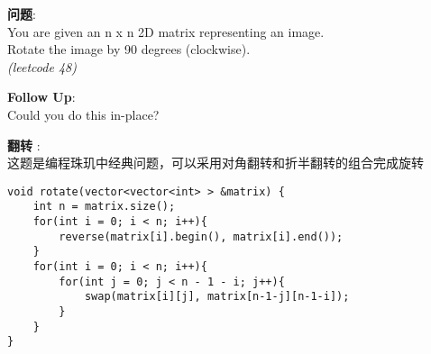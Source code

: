     
\begin{description}
    \item{\textbf{问题}}:\\
You are given an n x n 2D matrix representing an image.\\
Rotate the image by 90 degrees (clockwise). \\
\textit{(leetcode 48)}
    \item{\textbf{Follow Up}}:\\
Could you do this in-place?
    \item{\textbf{翻转}} : 
    \\这题是编程珠玑中经典问题，可以采用对角翻转和折半翻转的组合完成旋转
    \begin{lstlisting}
void rotate(vector<vector<int> > &matrix) {
	int n = matrix.size();
	for(int i = 0; i < n; i++){
		reverse(matrix[i].begin(), matrix[i].end());
	}
	for(int i = 0; i < n; i++){
		for(int j = 0; j < n - 1 - i; j++){
			swap(matrix[i][j], matrix[n-1-j][n-1-i]);
		}
	}
}
    \end{lstlisting}
\end{description}
